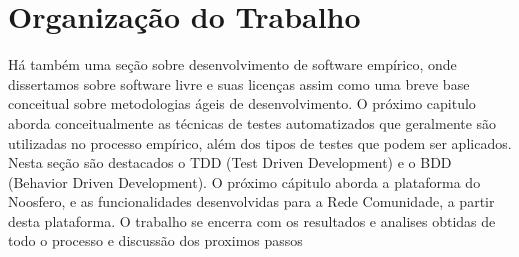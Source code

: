 	\section{Organização do Trabalho}
	
	
	Há também uma seção sobre desenvolvimento de software empírico, onde dissertamos sobre software livre 
	e suas licenças assim como uma breve base conceitual sobre metodologias ágeis de desenvolvimento.
	O próximo capitulo aborda conceitualmente as técnicas de testes automatizados que geralmente
	são utilizadas no processo empírico, além dos tipos de testes que podem ser aplicados. Nesta seção são 
	destacados o TDD (Test Driven Development) e o BDD (Behavior Driven Development).
	O próximo cápitulo aborda a plataforma do Noosfero, e as funcionalidades desenvolvidas para a Rede Comunidade, a partir desta plataforma.
	O trabalho se encerra com os resultados e analises obtidas de todo o processo e discussão dos proximos passos



